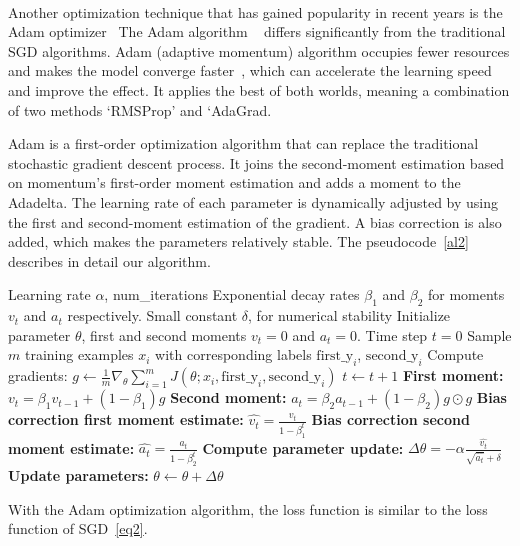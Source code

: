 \documentclass[../ICIT-Paper-2024.tex]{subfiles}
\begin{document}
\paragraph{}
Another optimization technique that has gained popularity in recent years is the Adam optimizer ~\cite{kingma2014adam}The Adam algorithm ~\cite{liu2023improved} differs significantly from the traditional SGD algorithms. Adam (adaptive momentum) algorithm occupies fewer resources and makes the model converge faster~\cite{yaguchi2018adam}, which can accelerate the learning speed and improve the effect. It applies the best of both worlds, meaning a combination of two methods ‘RMSProp’ and ‘AdaGrad. 

Adam is a first-order optimization algorithm that can replace the traditional stochastic gradient descent process. It joins the second-moment estimation based on momentum’s first-order moment estimation and adds a moment to the Adadelta. The learning rate of each parameter is dynamically adjusted by using the first and second-moment estimation of the gradient. A bias correction is also added, which makes the parameters relatively stable. The pseudocode~\ref{al2} describes in detail our algorithm.

\begin{algorithm}[H]
\caption{Adam Algorithm Implementation.}\label{al2}
\begin{algorithmic}[1]
\Require Learning rate $\alpha$, num\_iterations
\Require Exponential decay rates $\beta_1$ and $\beta_2$ for moments $v_t$ and $a_t$ respectively.
\Require Small constant $\delta$, for numerical stability
\State Initialize parameter $\theta$, first and second moments $v_t = 0$ and $a_t = 0$.
\State Time step $t = 0$
    \State Sample $m$ training examples $x_i$ with corresponding labels $\mathrm{first\_y}_i$, $\mathrm{second\_y}_i$
    \State Compute gradients: $g \leftarrow \frac{1}{m} \nabla_\theta \sum_{i=1}^m J(\theta; x_i, \mathrm{first\_y}_i, \mathrm{second\_y}_i)$
    \State $t \leftarrow t + 1$
    \State \textbf{First moment:} $v_t = \beta_1 v_{t-1} + (1 - \beta_1) g$
    \State \textbf{Second moment:} $a_t = \beta_2 a_{t-1} + (1 - \beta_2) g \odot g$
    \State \textbf{Bias correction first moment estimate:} $\hat{v_t} = \frac{v_t}{1 - \beta_1^t}$
    \State \textbf{Bias correction second moment estimate:} $\hat{a_t} = \frac{a_t}{1 - \beta_2^t}$
    \State \textbf{Compute parameter update:} $\Delta \theta = -\alpha \frac{\hat{v_t}}{\sqrt{\hat{a_t}} + \delta}$
    \State \textbf{Update parameters:} $\theta \leftarrow \theta + \Delta \theta$
\EndFor
\end{algorithmic}
\end{algorithm}

With the Adam optimization algorithm, the loss function is similar to the loss function of SGD~\ref{eq2}.
\end{document}
